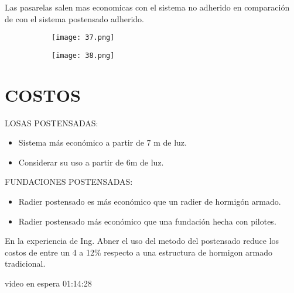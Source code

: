 Las pasarelas salen mas economicas con el sistema no adherido en
comparación de con el sistema postensado adherido.

\begin{figure}[H]
	\begin{subfigure}{0.5\textwidth}
	\centering
	\texttt{[image: 37.png]}
	\end{subfigure}
	\begin{subfigure}{0.5\textwidth}
	\centering
	\texttt{[image: 38.png]}
	\end{subfigure}
\end{figure}

\section{COSTOS}

LOSAS POSTENSADAS:

\begin{itemize}
	\item Sistema más económico a partir de 7 m de luz.
	\item Considerar su uso a partir de 6m de luz.
\end{itemize}

FUNDACIONES POSTENSADAS:

\begin{itemize}
	\item Radier postensado es más económico que un radier de hormigón armado.
	\item Radier postensado más económico que una fundación hecha con pilotes.
\end{itemize}

En la experiencia de Ing. Abner el uso del metodo del postensado reduce los costos
de entre un 4 a 12\% respecto a una estructura de hormigon armado tradicional.

video en espera 01:14:28

